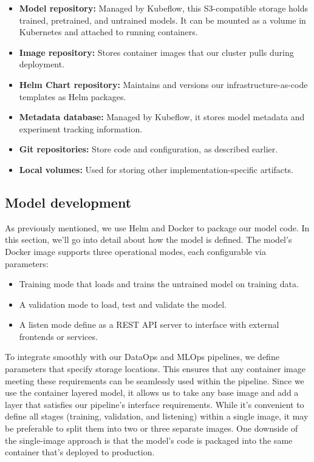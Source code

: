\begin{itemize}
    \item \textbf{Model repository:} Managed by Kubeflow, this S3-compatible storage holds trained, pretrained, and untrained models.
    It can be mounted as a volume in Kubernetes and attached to running containers.
    \item \textbf{Image repository:} Stores container images that our cluster pulls during deployment.
    \item \textbf{Helm Chart repository:} Maintains and versions our infrastructure-as-code templates as Helm packages.
    \item \textbf{Metadata database:} Managed by Kubeflow, it stores model metadata and experiment tracking information.
    \item \textbf{Git repositories:} Store code and configuration, as described earlier.
    \item \textbf{Local volumes:} Used for storing other implementation-specific artifacts.
\end{itemize}

\subsection{Model development}\label{subsec:model-development}
As previously mentioned, we use Helm and Docker to package our model code.
In this section, we'll go into detail about how the model is defined.
The model's Docker image supports three operational modes, each configurable via parameters:
\begin{itemize}
    \item Training mode that loads and trains the untrained model on training data.
    \item A validation mode to load, test and validate the model.
    \item A listen mode define as a REST API server to interface with external frontends or services.
\end{itemize}

To integrate smoothly with our DataOps and MLOps pipelines, we define parameters that specify storage locations.
This ensures that any container image meeting these requirements can be seamlessly used within the pipeline.
Since we use the container layered model, it allows us to take any base image and add a layer that satisfies our pipeline's interface requirements.
While it's convenient to define all stages (training, validation, and listening) within a single image, it may be preferable to split them into two or three separate images.
One downside of the single-image approach is that the model's code is packaged into the same container that's deployed to production.

